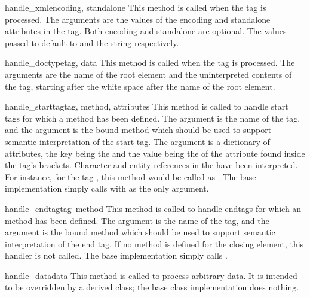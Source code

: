 \begin{funcdesc}{handle_xml}{encoding, standalone}
This method is called when the  tag is processed.
The arguments are the values of the encoding and standalone attributes 
in the tag.  Both encoding and standalone are optional.  The values
passed to  default to  and the string
 respectively.
\end{funcdesc}

\begin{funcdesc}{handle_doctype}{tag, data}
This method is called when the  tag is processed.
The arguments are the name of the root element and the uninterpreted
contents of the tag, starting after the white space after the name of
the root element.
\end{funcdesc}

\begin{funcdesc}{handle_starttag}{tag, method, attributes}
This method is called to handle start tags for which a
 method has been defined.  The 
argument is the name of the tag, and the  argument is the
bound method which should be used to support semantic interpretation
of the start tag.  The  argument is a dictionary of
attributes, the key being the  and the value being the
 of the attribute found inside the tag's \code{<>} brackets.
Character and entity references in the  have
been interpreted.  For instance, for the tag
, this method would be called as
.
The base implementation simply calls  with 
as the only argument.
\end{funcdesc}

\begin{funcdesc}{handle_endtag}{tag\, method}
This method is called to handle endtags for which an
 method has been defined.  The 
argument is the name of the tag, and the
 argument is the bound method which should be used to
support semantic interpretation of the end tag.  If no
 method is defined for the closing element, this
handler is not called.  The base implementation simply calls
.
\end{funcdesc}

\begin{funcdesc}{handle_data}{data}
This method is called to process arbitrary data.  It is intended to be
overridden by a derived class; the base class implementation does
nothing.
\end{funcdesc}

